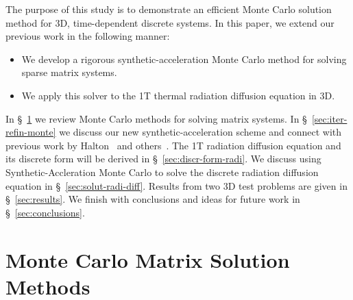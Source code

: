 \documentclass[preprint,12pt]{elsarticle}
\begin{document}
The purpose of this study is to demonstrate an efficient Monte Carlo
solution method for 3D, time-dependent discrete systems.  In this
paper, we extend our previous work in the following manner:
\begin{itemize}
\item We develop a rigorous synthetic-acceleration Monte Carlo method
  for solving sparse matrix systems.
\item We apply this solver to the 1T thermal radiation diffusion
  equation in 3D.
\end{itemize}
In \S~\ref{sec:monte-carlo-matrix} we review Monte Carlo methods for
solving matrix systems. In \S~\ref{sec:iter-refin-monte} we discuss
our new synthetic-acceleration scheme and connect with previous work
by Halton~\cite{halton_1994} and others~\cite{evans_2003}.  The 1T
radiation diffusion equation and its discrete form will be derived in
\S~\ref{sec:discr-form-radi}.  We discuss using Synthetic-Accleration
Monte Carlo to solve the discrete radiation diffusion equation in
\S~\ref{sec:solut-radi-diff}.  Results from two 3D test problems are
given in \S~\ref{sec:results}.  We finish with conclusions and ideas
for future work in \S~\ref{sec:conclusions}.

\section{Monte Carlo Matrix Solution Methods}
\label{sec:monte-carlo-matrix}
\end{document}
